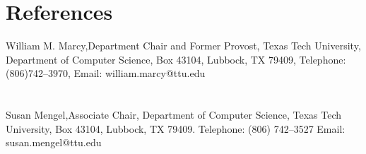 \documentclass[10pt]{resume}
\begin{document}


\section{References}{William M. Marcy,}{Department Chair and Former Provost, Texas Tech
  University, Department of Computer Science, Box 43104, Lubbock, TX 79409,
Telephone: (806)742--3970, Email: william.marcy@ttu.edu}



\section{}{Susan Mengel,}{Associate Chair, Department of Computer Science, 
  Texas Tech University, Box 43104, Lubbock, TX 79409. Telephone: (806)
  742--3527 Email: susan.mengel@ttu.edu}
\end{document}
